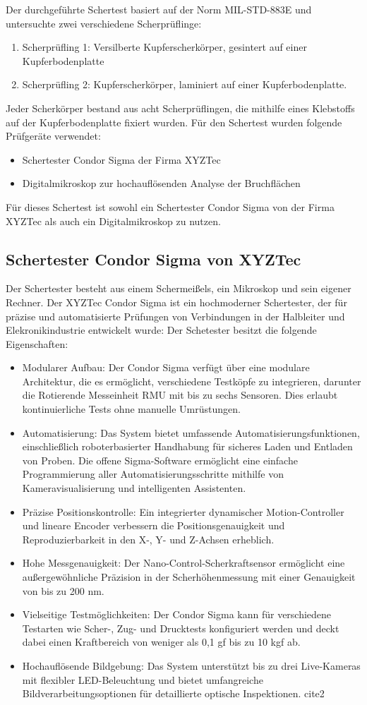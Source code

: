 Der durchgeführte Schertest basiert auf der Norm MIL-STD-883E und untersuchte zwei verschiedene Scherprüflinge:
\begin{enumerate}
    \item Scherprüfling 1: Versilberte Kupferscherkörper, gesintert auf einer Kupferbodenplatte
    \item Scherprüfling 2: Kupferscherkörper, laminiert auf einer Kupferbodenplatte.
\end{enumerate}
Jeder Scherkörper bestand aus acht Scherprüflingen, die mithilfe eines Klebstoffs auf der Kupferbodenplatte fixiert wurden.
Für den Schertest wurden folgende Prüfgeräte verwendet:
\begin{itemize}
    \item Schertester Condor Sigma der Firma XYZTec
    \item Digitalmikroskop zur hochauflösenden Analyse der Bruchflächen
\end{itemize}
Für dieses Schertest ist sowohl ein Schertester Condor Sigma von der Firma XYZTec als auch ein Digitalmikroskop  zu nutzen. 
\subsection{Schertester Condor Sigma von XYZTec}
Der Schertester besteht aus einem Schermeißels, ein Mikroskop und sein eigener Rechner. 
Der XYZTec Condor Sigma ist ein hochmoderner Schertester, der für präzise und automatisierte Prüfungen von Verbindungen in der Halbleiter und Elekronikindustrie entwickelt wurde:
Der Schetester besitzt die folgende Eigenschaften:
\begin{itemize}
    \item Modularer Aufbau: Der Condor Sigma verfügt über eine modulare Architektur, die es ermöglicht, verschiedene Testköpfe zu integrieren, darunter die Rotierende Messeinheit RMU mit bis zu sechs Sensoren. Dies erlaubt kontinuierliche Tests ohne manuelle Umrüstungen. 
    \item Automatisierung: Das System bietet umfassende Automatisierungsfunktionen, einschließlich roboterbasierter Handhabung für sicheres Laden und Entladen von Proben. Die offene Sigma-Software ermöglicht eine einfache Programmierung aller Automatisierungsschritte mithilfe von Kameravisualisierung und intelligenten Assistenten.
    \item Präzise Positionskontrolle: Ein integrierter dynamischer Motion-Controller und lineare Encoder verbessern die Positionsgenauigkeit und Reproduzierbarkeit in den X-, Y- und Z-Achsen erheblich.
    \item Hohe Messgenauigkeit: Der Nano-Control-Scherkraftsensor ermöglicht eine außergewöhnliche Präzision in der Scherhöhenmessung mit einer Genauigkeit von bis zu 200 nm. 
    \item Vielseitige Testmöglichkeiten: Der Condor Sigma kann für verschiedene Testarten wie Scher-, Zug- und Drucktests konfiguriert werden und deckt dabei einen Kraftbereich von weniger als 0,1 gf bis zu 10 kgf ab. 
    \item Hochauflösende Bildgebung: Das System unterstützt bis zu drei Live-Kameras mit flexibler LED-Beleuchtung und bietet umfangreiche Bildverarbeitungsoptionen für detaillierte optische Inspektionen. cite{2}
\end{itemize}
